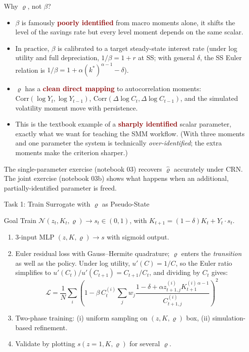 \documentclass[10pt,aspectratio=169]{beamer}
\newcommand{\emphc}[1]{\textbf{\textcolor{darkred}{#1}}}
\begin{document}
\begin{frame}{Why $\varrho$, not $\beta$?}
\small
\begin{itemize}
  \item $\beta$ is famously \emphc{poorly identified} from macro moments alone, it shifts the level of the savings rate but every level moment depends on the same scalar.
  \item In practice, $\beta$ is calibrated to a target steady-state interest rate (under log utility and full depreciation, $1/\beta = 1+r$ at SS; with general $\delta$, the SS Euler relation is $1/\beta = 1 + \alpha (k^*)^{\alpha-1} - \delta$).
  \item $\varrho$ has a \emphc{clean direct mapping} to autocorrelation moments: $\mathrm{Corr}(\log Y_t, \log Y_{t-1})$, $\mathrm{Corr}(\Delta\log C_t, \Delta\log C_{t-1})$, and the simulated volatility moment move with persistence.
  \item This is the textbook example of a \emphc{sharply identified} scalar parameter, exactly what we want for teaching the SMM workflow. (With three moments and one parameter the system is technically \emph{over-identified}; the extra moments make the criterion sharper.)
\end{itemize}
\vspace{0.2cm}
The single-parameter exercise (notebook 03) recovers $\hat\varrho$ accurately under CRN. The joint exercise (notebook 03b) shows what happens when an additional, partially-identified parameter is freed.
\end{frame}

\begin{frame}{Task 1: Train Surrogate with $\varrho$ as Pseudo-State}
\begin{block}{Goal}
Train $\mathcal{N}(z_t, K_t, \varrho) \to s_t \in (0,1)$, with $K_{t+1} = (1-\delta)K_t + Y_t \cdot s_t$.
\end{block}
\begin{enumerate}
  \itemsep1pt
  \item 3-input MLP $(z, K, \varrho) \to s$ with sigmoid output.
  \item Euler residual loss with Gauss--Hermite quadrature; $\varrho$ enters the \emph{transition} as well as the policy. Under log utility, $u'(C) = 1/C$, so the Euler ratio simplifies to $u'(C_t)/u'(C_{t+1}) = C_{t+1}/C_t$, and dividing by $C_t$ gives:
  {\small\[
  \mathcal{L} = \frac{1}{N}\sum_i \!\left(1 - \beta\, C^{(i)}_t \sum_j w_j \frac{1-\delta + \alpha z^{(i)}_{t+1,j} K^{(i)\,\alpha-1}_{t+1}}{C^{(i)}_{t+1,j}}\right)^{\!2}
  \]}
  \vspace{-10pt}
  \item Two-phase training: (i) uniform sampling on $(z, K, \varrho)$ box, (ii) simulation-based refinement.
  \item Validate by plotting $s(z=1, K, \varrho)$ for several $\varrho$.
\end{enumerate}
\end{frame}
\end{document}
